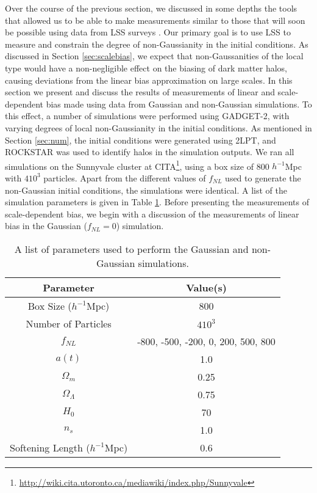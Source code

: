 \documentclass[10pt,letterpaper,final]{iopart}
\numberwithin{equation}{subsection}
\begin{document}
Over the course of the previous section, we discussed in some depths the tools that allowed us to be able to make measurements similar to those that will soon be possible using data from LSS surveys \cite{LSSSurveys}\cite{DES}\cite{LSST}\cite{DESI}\cite{Euclid}. Our primary goal is to use LSS to measure and constrain the degree of non-Gaussianity in the initial conditions.  As discussed in Section \ref{sec:scalebias}, we expect that non-Gaussanities of the local type would have a non-negligible effect on the biasing of dark matter halos, causing deviations from the linear bias approximation on large scales. In this section we present and discuss the results of measurements of linear and scale-dependent bias made using data from Gaussian and non-Gaussian simulations. To this effect, a number of simulations were performed using GADGET-2, with varying degrees of local non-Gaussianity in the initial conditions. As mentioned in Section \ref{sec:num}, the initial conditions were generated using 2LPT, and ROCKSTAR was used to identify halos in the simulation outputs. We ran all simulations on the Sunnyvale cluster at CITA\footnote{\url{http://wiki.cita.utoronto.ca/mediawiki/index.php/Sunnyvale}}, using a box size of 800 $h^{-1}$Mpc with $410^3$ particles. Apart from the different values of $f_{NL}$ used to generate the non-Gaussian initial conditions, the simulations were identical. A list of the simulation parameters is given in Table \ref{tab:sim}. Before presenting the measurements of scale-dependent bias, we begin with a discussion of the measurements of linear bias in the Gaussian ($f_{NL} = 0$) simulation.
 

\renewcommand{\arraystretch}{1.3}
\begin{table}[h!]
\begin{center}
	\begin{tabular}{ | c | c  |}
	\hline 
	\textbf{Parameter} & \textbf{Value(s)} \\ \hline
	Box Size ($h^{-1}$Mpc) & 800 \\ \hline
	Number of Particles & $410^3$ \\ \hline
	$f_{NL}$ & -800, -500, -200, 0, 200, 500, 800 \\ \hline
	$a(t)$ & 1.0  \\ \hline
	$\Omega_m$ & 0.25 \\ \hline
	$\Omega_\Lambda$ & 0.75 \\ \hline
	$H_0$ & 70 \\ \hline
	$n_s$ &1.0 \\ \hline
	Softening Length ($h^{-1}$Mpc) & 0.6 \\ \hline
		
	\end{tabular}
\end{center}
\caption{A list of parameters used to perform the Gaussian and non-Gaussian simulations.} \label{tab:sim}
\end{table}
\end{document}
